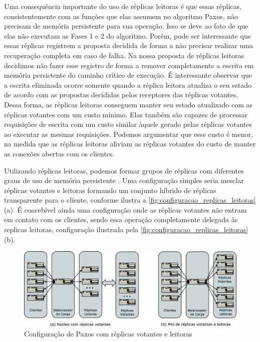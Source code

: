 Uma consequência importante do uso de réplicas leitoras é que essas réplicas,
consistentemente com as funções que elas assumem no algoritmo Paxos, não precisam de
memória persistente para sua operação. Isso se deve ao fato de que elas não executam as
Fases 1 e 2 do algoritmo. Porém, pode ser interessante que essas réplicas registrem a
proposta decidida de forma a não precisar realizar uma recuperação completa em caso de
falha. Na nossa proposta de réplicas leitoras decidimos não fazer esse registro de forma a
remover completamente a escrita em memória persistente do caminho crítico de execução. É
interessante observar que a escrita eliminada ocorre somente quando a réplica leitora
atualiza o seu estado de acordo com as propostas decididas pelos receptores das réplicas
votantes. Dessa forma, as réplicas leitoras conseguem manter seu estado atualizado com as
réplicas votantes com um custo mínimo. Elas também são capazes de processar requisições de
escrita com um custo similar àquele gerado pelas réplicas votantes ao executar as mesmas
requisições. Podemos argumentar que esse custo é menor, na medida que as réplicas leitoras
aliviam as réplicas votantes do custo de manter as conexões abertas com os clientes.

Utilizando réplicas leitoras, podemos formar grupos de réplicas com diferentes graus de
uso de memória persistente \cite{aguilera00}. Uma configuração simples seria mesclar
réplicas votantes e leitoras formando um conjunto híbrido de réplicas transparente para o
cliente, conforme ilustra a \autoref{fig:configuracao_replicas_leitoras} (a). É concebível
ainda uma configuração onde as réplicas votantes não entram em contato com os clientes,
sendo essa operação completamente delegada às replicas leitoras, configuração ilustrada
pela \autoref{fig:configuracao_replicas_leitoras} (b).

\begin{figure}[ht]
  \begin{center}
    \includegraphics[width=16cm]{conteudo/capitulos/figuras/configuracao_replicas_leitoras.eps}
  \end{center}
  \caption{Configuração de Paxos com réplicas votantes e leitoras}
  \label{fig:configuracao_replicas_leitoras}
\end{figure}

